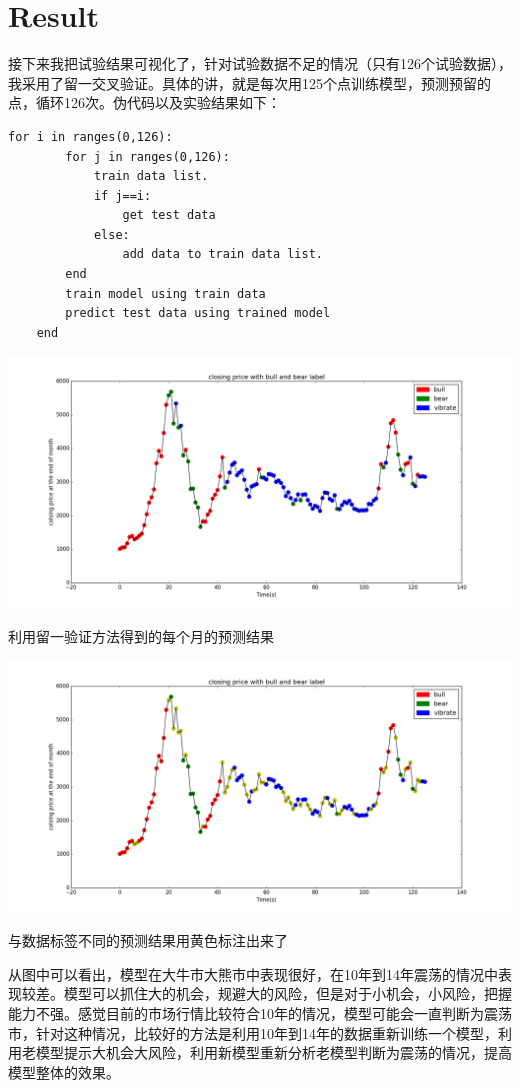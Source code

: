 \documentclass[10pt,a4paper]{article}
\begin{document}
\section{Result }
接下来我把试验结果可视化了，针对试验数据不足的情况（只有126个试验数据），我采用了留一交叉验证。具体的讲，就是每次用125个点训练模型，预测预留的点，循环126次。伪代码以及实验结果如下：
	\begin{lstlisting}[title=伪代码, frame=shadowbox]
	for i in ranges(0,126):
		for j in ranges(0,126):
			train data list.
			if j==i:
				get test data
			else:
				add data to train data list.
		end
		train model using train data
		predict test data using trained model
	end
	\end{lstlisting}
\begin{center}
	\includegraphics[width=1\textwidth]{测试结果可视化.png}
	\caption{利用留一验证方法得到的每个月的预测结果}
\end{center}
\begin{center}
	\includegraphics[width=1\textwidth]{测试结果可视化-带误分类标记.png}
	\caption{与数据标签不同的预测结果用黄色标注出来了}
\end{center}

从图中可以看出，模型在大牛市大熊市中表现很好，在10年到14年震荡的情况中表现较差。模型可以抓住大的机会，规避大的风险，但是对于小机会，小风险，把握能力不强。感觉目前的市场行情比较符合10年的情况，模型可能会一直判断为震荡市，针对这种情况，比较好的方法是利用10年到14年的数据重新训练一个模型，利用老模型提示大机会大风险，利用新模型重新分析老模型判断为震荡的情况，提高模型整体的效果。
\end{document}
